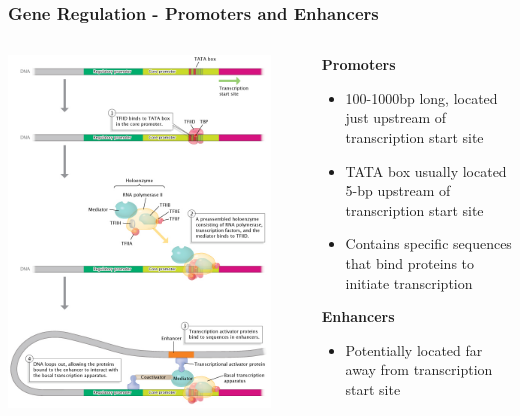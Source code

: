 \documentclass{beamer}
\begin{document}
\begin{frame}
	\frametitle{Gene Regulation - Promoters and Enhancers }
	\begin{columns}
		\begin{column}{0.5\textwidth}
			\centering	\includegraphics[keepaspectratio, width  = 0.9\textwidth]{img/initiatingExpression}
		\end{column}
		\begin{column}{0.5\textwidth}
			\scriptsize
			\textbf{Promoters}
			\begin{itemize}
				\item 100-1000bp long, located just upstream of transcription start site
				\item TATA box usually located 5-bp upstream of transcription start site
				\item Contains specific sequences that bind proteins to initiate transcription \pause
			\end{itemize}
			\textbf{Enhancers}
			\begin{itemize}
				\item Potentially located far away from transcription start site

\end{itemize}
\end{column}
\end{columns}
\end{frame}
\end{document}
